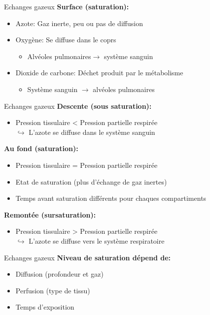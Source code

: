 \begin{frame}{Echanges gazeux}  
	\textbf{Surface (saturation):}
	\begin{itemize}
		\item Azote: Gaz inerte, peu ou pas de diffusion
		\item Oxygène: Se diffuse dans le coprs
		\begin{itemize}
			\item  Alvéoles pulmonaires$\rightarrow$  système sanguin
		\end{itemize}
		\item Dioxide de carbone: Déchet produit par le métabolisme
		\begin{itemize}
			\item Système sanguin $\rightarrow$  alvéoles pulmonaires
		\end{itemize}
	\end{itemize}
\end{frame}

\begin{frame}{Echanges gazeux}  
	\textbf{Descente (sous saturation):}
	\begin{itemize}
		\item Pression tissulaire < Pression partielle respirée\\
				$\hookrightarrow$ L'azote se diffuse dans le système sanguin
	\end{itemize}
	\vfill
	\textbf{Au fond (saturation):}
	\begin{itemize}
		\item Pression tissulaire = Pression partielle respirée
		\item Etat de saturation (plus d'échange de gaz inertes)
		\item Temps avant saturation différents pour chaques compartiments
	\end{itemize}
	\vfill
	\textbf{Remontée (sursaturation):}
	\begin{itemize}
		\item Pression tissulaire > Pression partielle respirée\\
				$\hookrightarrow$ L'azote se diffuse vers le système respiratoire
	\end{itemize}
\end{frame}

\begin{frame}{Echanges gazeux}  
	\textbf{Niveau de saturation dépend de:}
	\begin{itemize}
		\item Diffusion (profondeur et gaz)
		\item Perfusion (type de tissu)
		\item Temps d'exposition
	\end{itemize}
\end{frame}

